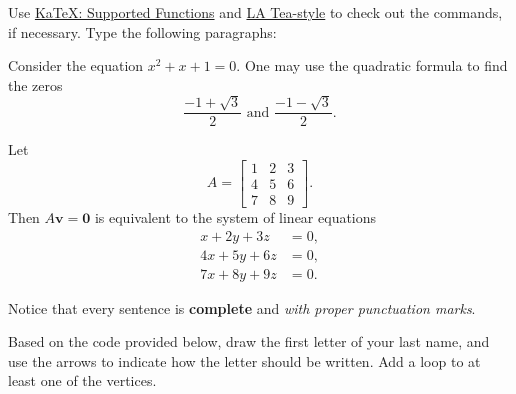 \documentclass{article}
\theoremstyle{definition}
\newcommand{\bzero}{\mathbf{0}}
\newcommand{\bv}{\mathbf{v}}
\begin{document}
Use \href{https://katex.org/docs/supported.html}{KaTeX: Supported Functions} and \href{https://sagelabtw.github.io/LA-Tea/style.html}{LA Tea-style} to check out the commands, if necessary.  Type the following paragraphs:
\medskip

Consider the equation $x^2 + x + 1 = 0$.  One may use the quadratic formula to find the zeros  
\[\frac{-1+\sqrt{3}}{2} \text{ and } \frac{-1-\sqrt{3}}{2}.\]

Let 
\[A = \begin{bmatrix}
 1 & 2 & 3 \\
 4 & 5 & 6 \\
 7 & 8 & 9
\end{bmatrix}.\]
Then $A\bv = \bzero$ is equivalent to the system of linear equations
\[\begin{aligned}
 x + 2y + 3z &= 0, \\
 4x + 5y + 6z &= 0, \\
 7x + 8y + 9z &= 0.
\end{aligned}\]

Notice that every sentence is \textbf{complete} and \emph{with proper punctuation marks}.

\bigskip

Based on the code provided below, draw the first letter of your last name, and use the arrows to indicate how the letter should be written.  Add a loop to at least one of the vertices.
\medskip

\begin{center}
\end{center}
\end{document}
